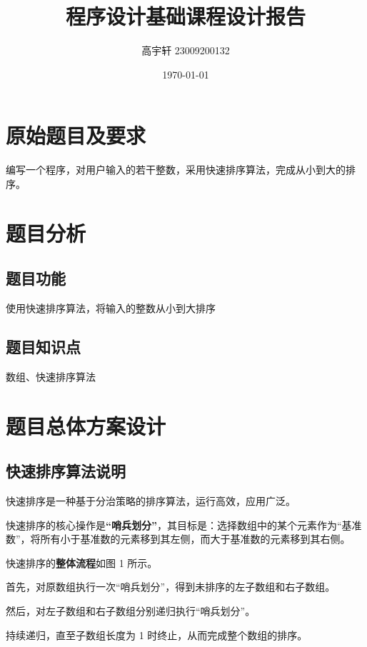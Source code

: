 \documentclass{ctexart}
\title{\vspace{-2cm}\textbf{程序设计基础课程设计报告} \\ \fontsize{12}{14}{---快速排序算法}}
\author{高宇轩 23009200132}
\date{\today}
\begin{document}
    
    \maketitle
    
    \section{原始题目及要求}
    编写一个程序，对用户输入的若干整数，采用快速排序算法，完成从小到大的排序。
    
    \section{题目分析}
    
    \subsection{题目功能}
    使用快速排序算法，将输入的整数从小到大排序
    \subsection{题目知识点}
    数组、快速排序算法
    
    \section{题目总体方案设计}
    
    \subsection{快速排序算法说明}

    快速排序是一种基于分治策略的排序算法，运行高效，应用广泛。 
    
    快速排序的核心操作是\textbf{“哨兵划分”}，其目标是：选择数组中的某个元素作为“基准数”，将所有小于基准数的元素移到其左侧，而大于基准数的元素移到其右侧。
    \newline 
    
    
    快速排序的\textbf{整体流程}如图 1 所示。 
    
    首先，对原数组执行一次“哨兵划分”，得到未排序的左子数组和右子数组。 
    
    然后，对左子数组和右子数组分别递归执行“哨兵划分”。 
    
    持续递归，直至子数组长度为 1 时终止，从而完成整个数组的排序。
\end{document}
